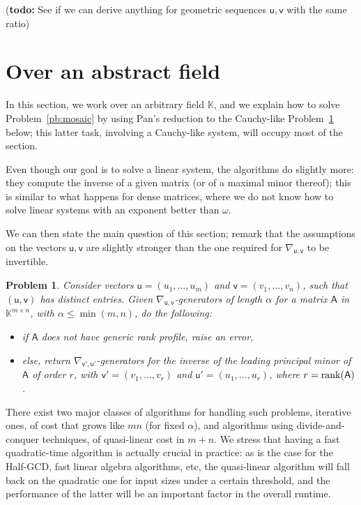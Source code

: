 \documentclass{sig-alternate}
\newcommand{\vu}{\ensuremath{\mathsf{u}}}
\newcommand{\vv}{\ensuremath{\mathsf{v}}}
\newcommand{\mA}{\ensuremath{\mathsf{A}}}
\newcommand{\K}{\ensuremath{\mathbb{K}}}
\newcommand{\todo}[1]{(\textbf{todo:} #1)}
\newtheorem{pbm}{Problem}
\begin{document}
\todo{See if we can derive anything for geometric sequences $\vu, \vv$ with the
  same ratio}


\section{Over an abstract field}

In this section, we work over an arbitrary field $\K$, and we explain
how to solve Problem~\ref{pb:mosaic} by using Pan's reduction to the
Cauchy-like Problem~\ref{pb:cauchy} below; this latter task, involving
a Cauchy-like system, will occupy most of the section.

Even though our goal is to solve a linear system, the algorithms do
slightly more: they compute the inverse of a given matrix (or of a
maximal minor thereof); this is similar to what happens for dense
matrices, where we do not know how to solve linear systems with an
exponent better than $\omega$.

We can then state the main question of this section; remark that the
assumptions on the vectors $\vu,\vv$ are slightly stronger than the one
required for $\nabla_{\vu,\vv}$ to be invertible.
\begin{pbm}\label{pb:cauchy}
  Consider vectors $\vu=(u_1,\dots,u_m)$ and $\vv=(v_1,\dots,v_n)$,
  such that $(\vu,\vv)$ has distinct entries. Given
  $\nabla_{\vu,\vv}$-generators of length $\alpha$ for a matrix $\mA$
  in $\K^{m \times n}$, with $\alpha \le \min(m,n)$, do the following:
  \begin{itemize}
  \item if $\mA$ does not have generic rank profile, raise an error,
  \item else, return $\nabla_{\vv',\vu'}$-generators for the inverse
    of the leading principal minor of $\mA$ of order $r$, with
    $\vv'=(v_1,\dots,v_r)$ and $\vu'=(u_1,\dots,u_r)$, where
    $r={\rm rank}(\mA)$.
\end{itemize}
\end{pbm}
There exist two major classes of algorithms for handling such
problems, iterative ones, of cost that grows like $mn$ (for fixed
$\alpha$), and algorithms using divide-and-conquer techniques, of
quasi-linear cost in $m+n$. We stress that having a fast
quadratic-time algorithm is actually crucial in practice: as is the
case for the Half-GCD, fast linear algebra algorithms, etc, the
quasi-linear algorithm will fall back on the quadratic one for input
sizes under a certain threshold, and the performance of the latter
will be an important factor in the overall runtime.
\end{document}
